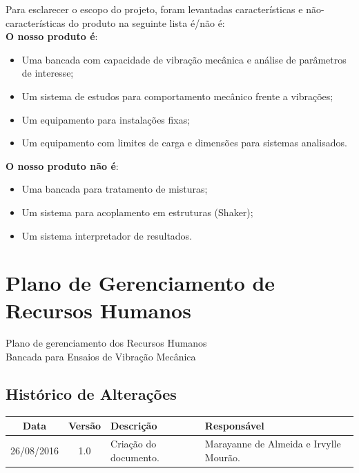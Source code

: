 \begin{apendicesenv}

Para esclarecer o escopo do projeto, foram levantadas características e não-características do produto na seguinte lista é/não é:\\

\textbf{O nosso produto é}:
\begin{itemize}
  \item Uma bancada com capacidade de vibração mecânica e análise de parâmetros de interesse;
  \item Um sistema de estudos para comportamento mecânico frente a vibrações;
  \item Um equipamento para instalações fixas;
  \item Um equipamento com limites de carga e dimensões para sistemas analisados.
\end{itemize}

\textbf{O nosso produto não é}:
\begin{itemize}
  \item Uma bancada para tratamento de misturas;
  \item Um sistema para acoplamento em estruturas (Shaker);
  \item Um sistema interpretador de resultados.
\end{itemize}


\chapter{Plano de Gerenciamento de Recursos Humanos}		   			\label{plano_de_rh}
% 	


\begin{center}
 {\large Plano de gerenciamento dos Recursos Humanos}\\[0.2cm]
 {Bancada para Ensaios de Vibração Mecânica}\\
 
 \end{center}
 
 \section*{Histórico de Alterações}
\begin{table}[h]
\centering
\begin{tabular}{|c|c|p{6cm}|p{5cm}|}
\hline
Data & Versão & Descrição & Responsável\\
\hline                               
26/08/2016 & 1.0 & Criação do documento. & Marayanne de Almeida e Irvylle Mourão.\\


\end{tabular}
\end{table}
\end{apendicesenv}

